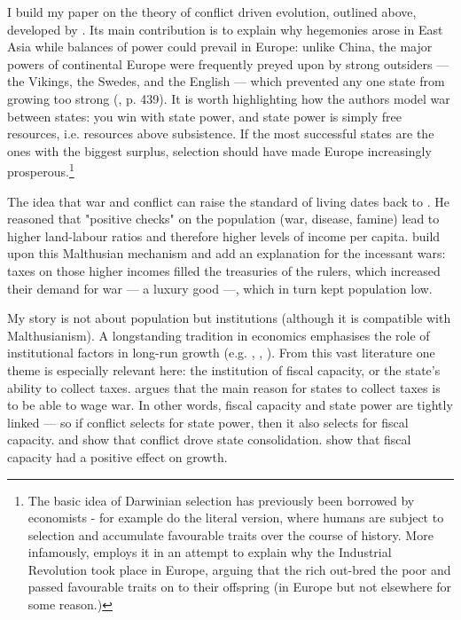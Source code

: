 \documentclass{article}
\begin{document}
I build my paper on the theory of conflict driven evolution, outlined above, developed by \cite{levine2013, levine2021, levine2022}. Its main contribution is to explain why hegemonies arose in East Asia while balances of power could prevail in Europe: unlike China, the major powers of continental Europe were frequently preyed upon by strong outsiders --- the Vikings, the Swedes, and the English --- which prevented any one state from growing too strong (\citealp{levine2021}, p. 439). It is worth highlighting how the authors model war between states: you win with state power, and state power is simply free resources, i.e. resources above subsistence. If the most successful states are the ones with the biggest surplus, selection should have made Europe increasingly prosperous.\footnote{The basic idea of Darwinian selection has previously been borrowed by economists - for example \cite{galor2002} do the literal version, where humans are subject to selection and accumulate favourable traits over the course of history. More infamously, \cite{clark2007} employs it in an attempt to explain why the Industrial Revolution took place in Europe, arguing that the rich out-bred the poor and passed favourable traits on to their offspring (in Europe but not elsewhere for some reason.)}

The idea that war and conflict can raise the standard of living dates back to \cite{malthus1798}. He reasoned that "positive checks" on the population (war, disease, famine) lead to higher land-labour ratios and therefore higher levels of income per capita. \cite{voigtlnder2013} build upon this Malthusian mechanism and add an explanation for the incessant wars: taxes on those higher incomes filled the treasuries of the rulers, which increased their demand for war --- a luxury good ---, which in turn kept population low. 

My story is not about population but institutions (although it is compatible with Malthusianism). A longstanding tradition in economics emphasises the role of institutional factors in long-run growth (e.g. \cite{north1970}, \cite{delong1993}, \cite{ajr2001}). From this vast literature one theme is especially relevant here: the institution of fiscal capacity, or the state's ability to collect taxes. \cite{tilly1985} argues that the main reason for states to collect taxes is to be able to wage war. In other words, fiscal capacity and state power are tightly linked --- so if conflict selects for state power, then it also selects for fiscal capacity. \cite{gennaioli2015} and \cite{cantoni2023} show that conflict drove state consolidation. \cite{dincecco2012} show that fiscal capacity had a positive effect on growth.
\end{document}
